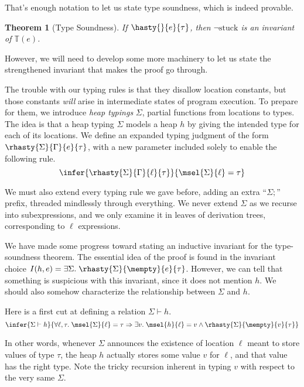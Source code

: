 \documentclass{amsbook}
\newtheorem{theorem}{Theorem}[chapter]
\theoremstyle{definition}
\theoremstyle{remark}
\numberwithin{section}{chapter}
\numberwithin{equation}{chapter}
\begin{document}
That's enough notation to let us state type soundness, which is indeed provable.

\begin{theorem}[Type Soundness]
  If $\hasty{}{e}{\tau}$, then $\neg \textrm{stuck}$ is an invariant of $\mathbb T(e)$.
\end{theorem}

However, we will need to develop some more machinery to let us state the strengthened invariant that makes the proof go through.

The trouble with our typing rules is that they disallow location constants, but those constants \emph{will} arise in intermediate states of program execution.
To prepare for them, we introduce \emph{heap typings} $\Sigma$, partial functions from locations to types.
The idea is that a heap typing $\Sigma$ models a heap $h$ by giving the intended type for each of its locations.
We define an expanded typing judgment of the form $\rhasty{\Sigma}{\Gamma}{e}{\tau}$, with a new parameter included solely to enable the following rule.
$$\infer{\rhasty{\Sigma}{\Gamma}{\ell}{\tau}}{
  \msel{\Sigma}{\ell} = \tau
}$$

We must also extend every typing rule we gave before, adding an extra ``$\Sigma;$'' prefix, threaded mindlessly through everything.
We never extend $\Sigma$ as we recurse into subexpressions, and we only examine it in leaves of derivation trees, corresponding to $\ell$ expressions.

We have made some progress toward stating an inductive invariant for the type-soundness theorem.
The essential idea of the proof is found in the invariant choice $I(h, e) = \exists \Sigma. \; \rhasty{\Sigma}{\mempty}{e}{\tau}$.
However, we can tell that something is suspicious with this invariant, since it does not mention $h$.
We should also somehow characterize the relationship between $\Sigma$ and $h$.

\newcommand{\heapty}[2]{#1 \vdash #2}

Here is a first cut at defining a relation $\heapty{\Sigma}{h}$.
$$\infer{\heapty{\Sigma}{h}}{
  \forall \ell, \tau. \; \msel{\Sigma}{\ell} = \tau \Rightarrow \exists v. \; \msel{h}{\ell} = v \land \rhasty{\Sigma}{\mempty}{v}{\tau}
}$$

In other words, whenever $\Sigma$ announces the existence of location $\ell$ meant to store values of type $\tau$, the heap $h$ actually stores some value $v$ for $\ell$, and that value has the right type.
Note the tricky recursion inherent in typing $v$ with respect to the very same $\Sigma$.
\end{document}
